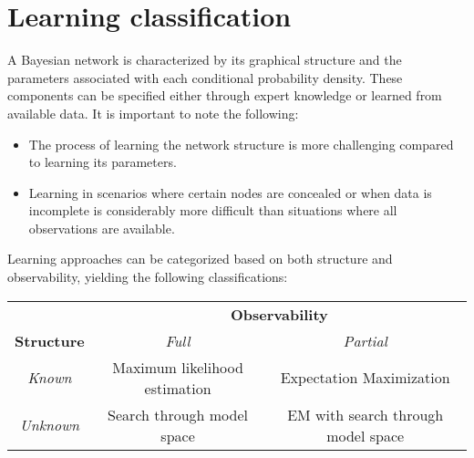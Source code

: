 \section{Learning classification}

A Bayesian network is characterized by its graphical structure and the parameters associated with each conditional probability density.
These components can be specified either through expert knowledge or learned from available data. 
It is important to note the following:
\begin{itemize}
    \item The process of learning the network structure is more challenging compared to learning its parameters.
    \item Learning in scenarios where certain nodes are concealed or when data is incomplete is considerably more difficult than situations where all observations are available.
\end{itemize}
Learning approaches can be categorized based on both structure and observability, yielding the following classifications:
\begin{table}[H]
    \centering
    \begin{tabular}{ccc}
                                            & \multicolumn{2}{c}{\textbf{Observability}}                                              \\ \cline{2-3} 
    \multicolumn{1}{c|}{\textbf{Structure}} & \textit{Full}                 & \multicolumn{1}{c|}{\textit{Partial}}                   \\ \hline
    \multicolumn{1}{|c|}{\textit{Known}}    & Maximum likelihood estimation & \multicolumn{1}{c|}{Expectation Maximization}           \\
    \multicolumn{1}{|c|}{\textit{Unknown}}  & Search through model space    & \multicolumn{1}{c|}{EM with search through model space} \\ \hline
    \end{tabular}
\end{table}

